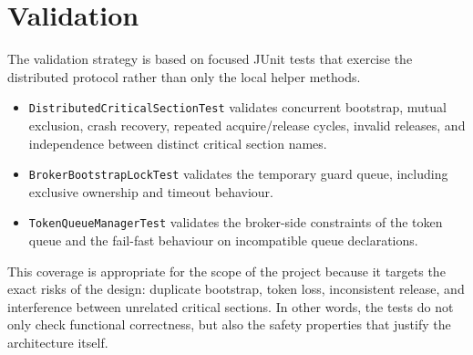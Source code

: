 \clearpage
\section{Validation}

The validation strategy is based on focused JUnit tests that exercise the
distributed protocol rather than only the local helper methods.
\begin{itemize}
    \item \texttt{DistributedCriticalSectionTest} validates concurrent
    bootstrap, mutual exclusion, crash recovery, repeated acquire/release
    cycles, invalid releases, and independence between distinct critical
    section names.
    \item \texttt{BrokerBootstrapLockTest} validates the temporary guard queue,
    including exclusive ownership and timeout behaviour.
    \item \texttt{TokenQueueManagerTest} validates the broker-side constraints
    of the token queue and the fail-fast behaviour on incompatible queue
    declarations.
\end{itemize}

This coverage is appropriate for the scope of the project because it targets
the exact risks of the design: duplicate bootstrap, token loss, inconsistent
release, and interference between unrelated critical sections. In other words,
the tests do not only check functional correctness, but also the safety
properties that justify the architecture itself.
